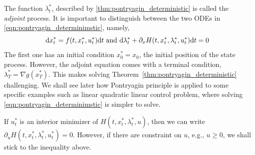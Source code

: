 \documentclass[11pt]{book}
\newcommand{\dd}{\text{\normalfont d}}
\newcommand{\dt}{\text{\normalfont d}t}
\newcommand{\dx}{\text{\normalfont d}x}
\begin{document}
The function $\lambda^*_t$, described by \ref{thm:pontryagin_deterministic} is called the \emph{adjoint} process. It is important to distinguish between the two ODEs in \eqref{eqn:pontryagin_determinimstic}, namely, 
\begin{equation}
    {\dx}^*_t = f(t,x^*_t,u^*_t) {\dt} \text{ and }{\dd}\lambda^*_t+ \partial_x H(t,x^*_t,\lambda^*_t,u^*_t){\dt}=0
\end{equation}
The first one has an initial condition $x^*_0=x_0$, the initial position of the state process. However, the adjoint equation comes with a terminal condition, $\lambda^*_T=\nabla g(x^*_T)$. This makes solving Theorem~\ref{thm:pontryagin_deterministic} challenging. We shall see later how Pontryagin principle is applied to some specific examples such as linear quadratic linear control problem, where solving \eqref{eqn:pontryagin_determinimstic} is simpler to solve. 
\begin{rem}
If $u^*_t$ is an interior minimizer of $H(t,x^*_t,\lambda^*_t,u)$, then we can write $\partial_u H(t,x^*_t,\lambda^*_t,u^*_t)=0$. However, if there are constraint on $u$, e.g., $u\ge0$, we shall stick to the inequality above. 
\end{rem}
\end{document}
